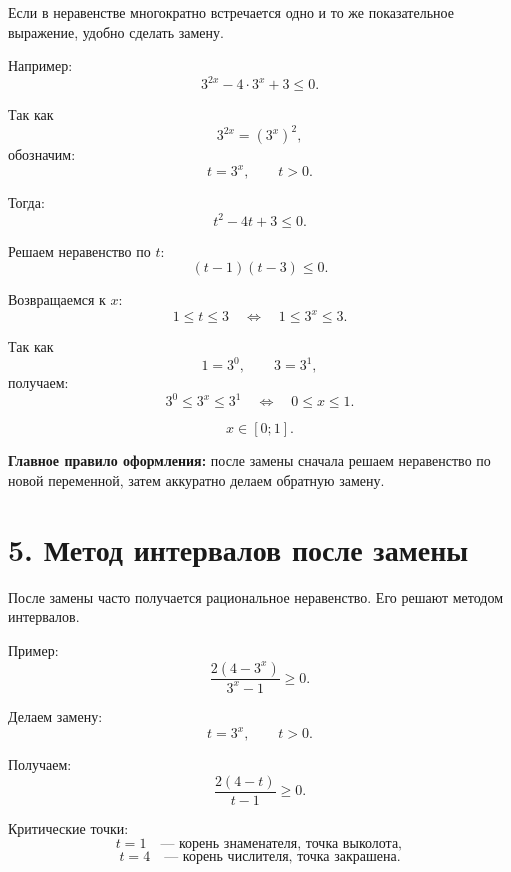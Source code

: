 \documentclass[a4paper,12pt]{article}
\newcommand{\sectionline}{\vspace{2mm}{\color{linegray}\hrule height 0.5pt}\vspace{2mm}}
\newcommand{\important}[1]{\textcolor{darkaccent}{\textbf{#1}}}
\begin{document}
Если в неравенстве многократно встречается одно и то же показательное выражение, удобно сделать замену.

Например:
\[
3^{2x}-4\cdot3^x+3\le0.
\]

Так как
\[
3^{2x}=(3^x)^2,
\]
обозначим:
\[
t=3^x,\qquad t>0.
\]

Тогда:
\[
t^2-4t+3\le0.
\]

Решаем неравенство по $t$:
\[
(t-1)(t-3)\le0.
\]

\begin{center}
\end{center}

Возвращаемся к $x$:
\[
1\le t\le3
\quad\Longleftrightarrow\quad
1\le3^x\le3.
\]

Так как
\[
1=3^0,\qquad 3=3^1,
\]
получаем:
\[
3^0\le3^x\le3^1
\quad\Longleftrightarrow\quad
0\le x\le1.
\]

\[
\boxed{x\in[0;1]}.
\]

\important{Главное правило оформления:} после замены сначала решаем неравенство по новой переменной, затем аккуратно делаем обратную замену.

\sectionline

\section*{\textcolor{darkaccent}{5. Метод интервалов после замены}}

После замены часто получается рациональное неравенство. Его решают методом интервалов.

Пример:
\[
\frac{2(4-3^x)}{3^x-1}\ge0.
\]

Делаем замену:
\[
t=3^x,\qquad t>0.
\]

Получаем:
\[
\frac{2(4-t)}{t-1}\ge0.
\]

Критические точки:
\[
t=1 \quad \text{--- корень знаменателя, точка выколота},
\]
\[
t=4 \quad \text{--- корень числителя, точка закрашена}.
\]
\end{document}

